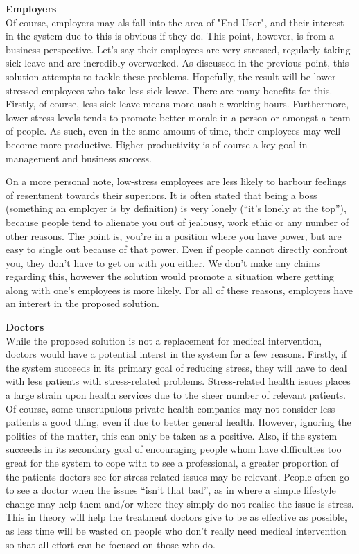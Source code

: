 \documentclass{scrartcl}
\begin{document}
\textbf{Employers}\\
Of course, employers may als fall into the area of "End User", and their interest in the system due to this is obvious if they do.
This point, however, is from a business perspective. Let's say their employees are very stressed, regularly taking sick leave and
are incredibly overworked. As discussed in the previous point, this solution attempts to tackle these problems. Hopefully, the
result will be lower stressed employees who take less sick leave. There are many benefits for this. Firstly, of course, less sick
leave means more usable working hours. Furthermore, lower stress levels tends to promote better morale in a person or amongst
a team of people. As such, even in the same amount of time, their employees may well become more productive. Higher productivity
is of course a key goal in management and business success.

On a more personal note, low-stress employees are less likely to
harbour feelings of resentment towards their superiors. It is often stated that being a boss (something an employer is by definition)
is very lonely (``it's lonely at the top''), because people tend to alienate you out of jealousy, work ethic or any number of
other reasons. The point is, you're in a position where you have power, but are easy to single out because of that power.
Even if people cannot directly confront you, they don't have to get on with you either. We don't make any claims regarding this,
however the solution would promote a situation where getting along with one's employees is more likely. For all of these reasons,
employers have an interest in the proposed solution.

\textbf{Doctors}\\
While the proposed solution is not a replacement for medical intervention, doctors would have a potential interst in the system
for a few reasons. Firstly, if the system succeeds in its primary goal of reducing stress, they will have to deal with less
patients with stress-related problems. Stress-related health issues places a large strain upon health services due to the
sheer number of relevant patients. Of course, some unscrupulous private health companies may not consider less patients a
good thing, even if due to better general health. However, ignoring the politics of the matter, this can only be taken as a positive.
Also, if the system succeeds in its secondary goal of encouraging people whom have difficulties too great for the system to cope
with to see a professional, a greater proportion of the patients doctors see for stress-related issues may be relevant. People
often go to see a doctor when the issues ``isn't that bad'', as in where a simple lifestyle change may help them and/or where they
simply do not realise the issue is stress. This in theory will help the treatment doctors give to be as effective as possible, as
less time will be wasted on people who don't really need medical intervention so that all effort can be focused on those who do.
\end{document}
